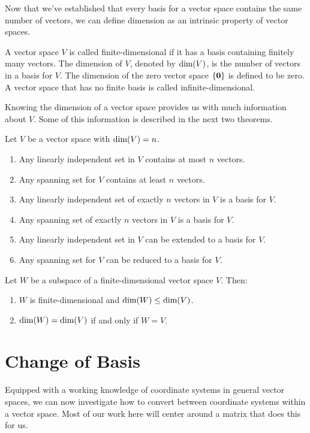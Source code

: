 \documentclass[../m073main.tex]{subfiles}
\begin{document}
Now that we've established that every basis for a vector space contains the same number of vectors, we can define dimension as an intrinsic property of vector spaces.

\begin{definition}[Dimension]
	A vector space $V$ is called finite-dimensional if it has a basis containing finitely many vectors.
	The dimension of $V$, denoted by $\textrm{dim}(V)$, is the number of vectors in a basis for $V$.
	The dimension of the zero vector space $\{\mathbf{0}\}$ is defined to be zero.
	A vector space that has no finite basis is called infinite-dimensional.
\end{definition}

Knowing the dimension of a vector space provides us with much information about $V$.
Some of this information is described in the next two theorems.

\begin{theorem}
	Let $V$ be a vector space with $\textrm{dim}(V) = n$.
	\begin{enumerate}[label=(\alph*)]
		\item Any linearly independent set in $V$ contains at most $n$ vectors.
		\item Any spanning set for $V$ contains at least $n$ vectors.
		\item Any linearly independent set of exactly $n$ vectors in $V$ is a basis for $V$.
		\item Any spanning set of exactly $n$ vectors in $V$ is a basis for $V$.
		\item Any linearly independent set in $V$ can be extended to a basis for $V$.
		\item Any spanning set for $V$ can be reduced to a basis for $V$.
	\end{enumerate}
\end{theorem}

\begin{theorem}
	Let $W$ be a subspace of a finite-dimensional vector space $V$.
	Then:
	\begin{enumerate}[label=(\alph*)]
		\item $W$ is finite-dimensional and $\textrm{dim}(W) \leq \textrm{dim}(V)$.
		\item $\textrm{dim}(W) = \textrm{dim}(V)$ if and only if $W = V$.
	\end{enumerate}
\end{theorem}

\section{Change of Basis}
Equipped with a working knowledge of coordinate systems in general vector spaces, we can now investigate how to convert between coordinate systems within a vector space.
Most of our work here will center around a matrix that does this for us.
\end{document}
